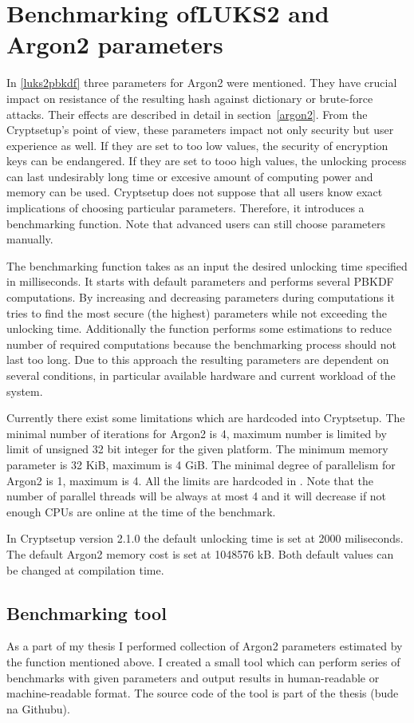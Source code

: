 \documentclass[nolof]{fithesis3}
\begin{document}
\section{Benchmarking ofLUKS2 and Argon2 parameters}
\label{sec:benchmark}
In \ref{luks2pbkdf} three parameters for Argon2 were mentioned. They have crucial impact on resistance of the resulting hash against dictionary or brute-force attacks. Their effects are described in detail in section~\ref{argon2}. From the Cryptsetup's point of view, these parameters impact not only security but  user experience as well. If they are set to too low values, the security of encryption keys can be endangered. If they are set to tooo high values, the unlocking process can last undesirably long time or  excesive amount of computing power and memory can be used. Cryptsetup does not suppose that all users know exact implications of choosing particular parameters. Therefore, it introduces a benchmarking function. Note that advanced users can still choose parameters manually.

The benchmarking function takes as an input the desired unlocking time specified in milliseconds. It starts with default parameters and performs several PBKDF computations. By increasing and decreasing parameters during computations it tries to find the most secure (the highest) parameters while not exceeding the unlocking time. Additionally the function performs some estimations to reduce number of required computations because the benchmarking process should not last too long. Due to this approach the resulting parameters are dependent on several conditions, in particular available hardware and current workload of the system.

Currently there exist some limitations which are hardcoded into Cryptsetup. The minimal number of iterations for Argon2 is 4, maximum number is limited by limit of unsigned 32 bit integer for the given platform. The minimum memory parameter is 32 KiB, maximum is 4 GiB. The minimal degree of parallelism for Argon2 is 1, maximum is 4. All the limits are hardcoded in \parencite{cryptsetupgitpbkdfcheck}. Note that the number of parallel threads will be always at most 4 and it will decrease if not enough CPUs are online at the time of the benchmark.

In Cryptsetup version 2.1.0 the default unlocking time is set at 2000 miliseconds. The default Argon2 memory cost is set at 1048576 kB. Both default values can be changed at compilation time.

\subsection{Benchmarking tool}
As a part of my thesis I performed collection of Argon2 parameters estimated by the function mentioned above. I created a small tool which can perform series of benchmarks with given parameters and output results in human-readable or machine-readable format. The source code of the tool is part of the thesis (bude na Githubu).
\end{document}
